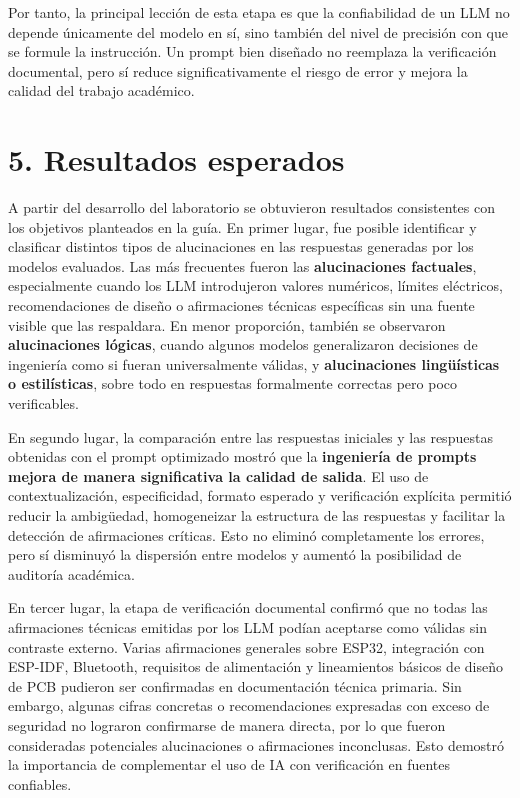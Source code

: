 \documentclass[11pt,a4paper]{article}
\begin{document}
Por tanto, la principal lección de esta etapa es que la confiabilidad de un LLM no depende únicamente del modelo en sí, sino también del nivel de precisión con que se formule la instrucción. Un prompt bien diseñado no reemplaza la verificación documental, pero sí reduce significativamente el riesgo de error y mejora la calidad del trabajo académico.

\section{5. Resultados esperados}

A partir del desarrollo del laboratorio se obtuvieron resultados consistentes con los objetivos planteados en la guía. En primer lugar, fue posible identificar y clasificar distintos tipos de alucinaciones en las respuestas generadas por los modelos evaluados. Las más frecuentes fueron las \textbf{alucinaciones factuales}, especialmente cuando los LLM introdujeron valores numéricos, límites eléctricos, recomendaciones de diseño o afirmaciones técnicas específicas sin una fuente visible que las respaldara. En menor proporción, también se observaron \textbf{alucinaciones lógicas}, cuando algunos modelos generalizaron decisiones de ingeniería como si fueran universalmente válidas, y \textbf{alucinaciones lingüísticas o estilísticas}, sobre todo en respuestas formalmente correctas pero poco verificables.

En segundo lugar, la comparación entre las respuestas iniciales y las respuestas obtenidas con el prompt optimizado mostró que la \textbf{ingeniería de prompts mejora de manera significativa la calidad de salida}. El uso de contextualización, especificidad, formato esperado y verificación explícita permitió reducir la ambigüedad, homogeneizar la estructura de las respuestas y facilitar la detección de afirmaciones críticas. Esto no eliminó completamente los errores, pero sí disminuyó la dispersión entre modelos y aumentó la posibilidad de auditoría académica.

En tercer lugar, la etapa de verificación documental confirmó que no todas las afirmaciones técnicas emitidas por los LLM podían aceptarse como válidas sin contraste externo. Varias afirmaciones generales sobre ESP32, integración con ESP-IDF, Bluetooth, requisitos de alimentación y lineamientos básicos de diseño de PCB pudieron ser confirmadas en documentación técnica primaria. Sin embargo, algunas cifras concretas o recomendaciones expresadas con exceso de seguridad no lograron confirmarse de manera directa, por lo que fueron consideradas potenciales alucinaciones o afirmaciones inconclusas. Esto demostró la importancia de complementar el uso de IA con verificación en fuentes confiables.
\end{document}

